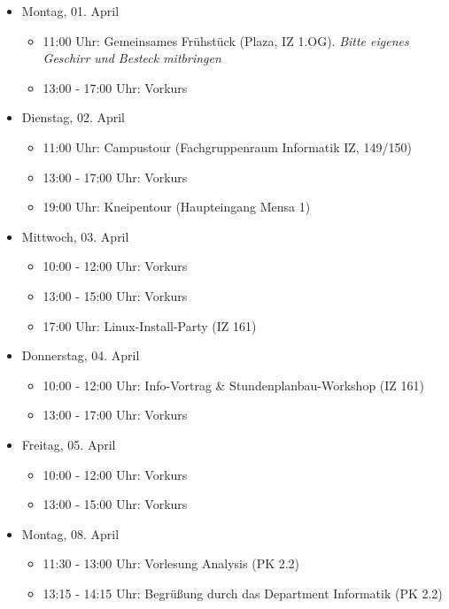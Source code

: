 \begin{itemize}
    \item Montag, 01. April
        \begin{itemize}
            \item 11:00 Uhr: Gemeinsames Frühstück (Plaza, IZ 1.OG). \emph{Bitte eigenes Geschirr und Besteck mitbringen}
            \item 13:00 - 17:00 Uhr: Vorkurs
        \end{itemize}
    \item Dienstag, 02. April
        \begin{itemize}
            \item 11:00 Uhr: Campustour (Fachgruppenraum Informatik IZ, 149/150)
            \item 13:00 - 17:00 Uhr: Vorkurs
            \item 19:00 Uhr: Kneipentour (Haupteingang Mensa 1)
        \end{itemize}
    \item Mittwoch, 03. April
        \begin{itemize}
            \item 10:00 - 12:00 Uhr: Vorkurs
            \item 13:00 - 15:00 Uhr: Vorkurs
            \item 17:00 Uhr: Linux-Install-Party (IZ 161)
        \end{itemize}
    \pagebreak
    \item Donnerstag, 04. April
        \begin{itemize}
            \item 10:00 - 12:00 Uhr: Info-Vortrag \& Stundenplanbau-Workshop (IZ 161)
            \item 13:00 - 17:00 Uhr: Vorkurs
        \end{itemize}
    \item Freitag, 05. April
        \begin{itemize}
            \item 10:00 - 12:00 Uhr: Vorkurs
            \item 13:00 - 15:00 Uhr: Vorkurs
        \end{itemize}
    \item Montag, 08. April
        \begin{itemize}
	    \item 11:30 - 13:00 Uhr: Vorlesung Analysis (PK 2.2)
            \item 13:15 - 14:15 Uhr: Begrüßung durch das Department Informatik (PK 2.2)

\end{itemize}
\end{itemize}
